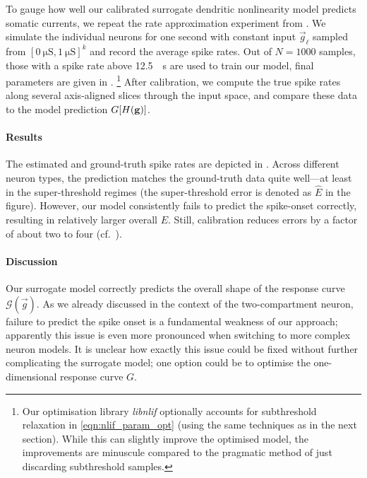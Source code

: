 To gauge how well our calibrated surrogate dendritic nonlinearity model predicts somatic currents, we repeat the rate approximation experiment from .
We simulate the individual neurons for one second with constant input $\vec g_\ell$ sampled from $[\SI{0}{\micro\siemens}, \SI{1}{\micro\siemens}]^k$ and record the average spike rates.
Out of $N = 1000$ samples, those with a spike rate above \SI{12.5}{\per\second} are used to train our model, final parameters are given in .%
\footnote{
Our optimisation library \emph{libnlif} optionally accounts for subthreshold relaxation in \cref{eqn:nlif_param_opt} (using the same techniques as in the next section).
While this can slightly improve the optimised model, the improvements are minuscule compared to the pragmatic method of just discarding subthreshold samples.
}
After calibration, we compute the true spike rates along several axis-aligned slices through the input space, and compare these data to the model prediction $G[{H}(\mathbf{g})]$.

\paragraph{Results}
The estimated and ground-truth spike rates are depicted in .
Across different neuron types, the prediction matches the ground-truth data quite well---at least in the super-threshold regimes (the super-threshold error is denoted as $\hat E$ in the figure).
However, our model consistently fails to predict the spike-onset correctly, resulting in relatively larger overall \RMSEpl $E$.
Still, calibration reduces errors by a factor of about two to four (cf.~).

\paragraph{Discussion}
Our surrogate model correctly predicts the overall shape of the response curve $\mathscr{G}(\vec g)$.
As we already discussed in the context of the two-compartment neuron, failure to predict the spike onset is a fundamental weakness of our approach; apparently this issue is even more pronounced when switching to more complex neuron models.
It is unclear how exactly this issue could be fixed without further complicating the surrogate model; one option could be to optimise the one-dimensional response curve $G$.


